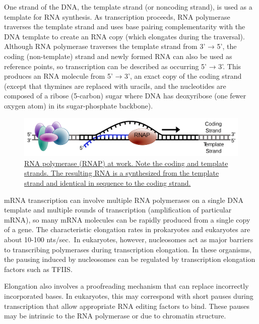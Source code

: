 One strand of the DNA, the template strand (or noncoding strand), is used as a template for RNA synthesis. As transcription proceeds, RNA polymerase traverses the template strand and uses base pairing complementarity with the DNA template to create an RNA copy (which elongates during the traversal). Although RNA polymerase traverses the template strand from 3' → 5', the coding (non-template) strand and newly formed RNA can also be used as reference points, so transcription can be described as occurring 5' → 3'. This produces an RNA molecule from 5' → 3', an exact copy of the coding strand (except that thymines are replaced with uracils, and the nucleotides are composed of a ribose (5-carbon) sugar where DNA has deoxyribose (one fewer oxygen atom) in its sugar-phosphate backbone).



\begin{figure}

{\centering \includegraphics[width=0.7\linewidth]{./figures/transcription/Simple_transcription_elongation1} 

}

\caption{\href{https://commons.wikimedia.org/wiki/File:Simple_transcription_elongation1.svg}{RNA polymerase (RNAP) at work. Note the coding and template strands. The resulting RNA is a synthesized from the template strand and identical in sequence to the coding strand.}}\label{fig:elongation}
\end{figure}

mRNA transcription can involve multiple RNA polymerases on a single DNA template and multiple rounds of transcription (amplification of particular mRNA), so many mRNA molecules can be rapidly produced from a single copy of a gene. The characteristic elongation rates in prokaryotes and eukaryotes are about 10-100 nts/sec.~In eukaryotes, however, nucleosomes act as major barriers to transcribing polymerases during transcription elongation. In these organisms, the pausing induced by nucleosomes can be regulated by transcription elongation factors such as TFIIS.

Elongation also involves a proofreading mechanism that can replace incorrectly incorporated bases. In eukaryotes, this may correspond with short pauses during transcription that allow appropriate RNA editing factors to bind. These pauses may be intrinsic to the RNA polymerase or due to chromatin structure.

